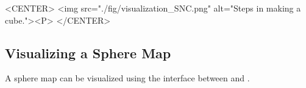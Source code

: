 \begin{ccHtmlOnly}
    <CENTER>
       <img src="./fig/visualization_SNC.png" alt="Steps in making a cube."><P>
    </CENTER>
\end{ccHtmlOnly}


\subsection{Visualizing a Sphere Map}

A sphere map can be visualized using the interface between
 and .


